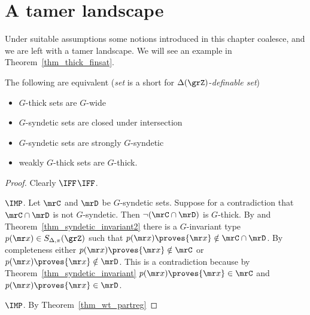 \section{A tamer landscape}\label{tame_landscape}

Under suitable assumptions some notions introduced in this chapter coalesce, and we are left with a tamer landscape.
We will see an example in Theorem~\ref{thm_thick_finsat}.

\begin{theorem}\label{thm_coalesce}
  The following are equivalent (\textit{set\/} is a short for $\Delta(\grZ)$-\textit{definable set})\nobreak
  \begin{itemize}
    \item[1.] $G$-thick sets are $G$-wide
    \item[2.] $G$-syndetic sets are closed under intersection 
    \item[3.] $G$-syndetic sets are strongly $G$-syndetic
    \item[4.] weakly $G$-thick sets are $G$-thick.
  \end{itemize}
\end{theorem}

\begin{proof}
  Clearly $\IFF$$\IFF$.

  $\IMP$.
  Let $\mrC$ and $\mrD$ be $G$-syndetic sets.
  Suppose for a contradiction that $\mrC\cap\mrD$ is not $G$-syndetic.
  Then $\neg(\mrC\cap\mrD)$ is $G$-thick.
  By  and Theorem~\ref{thm_syndetic_invariant2} there is a $G$-invariant type $p({\mr x})\in S_{\Delta,\pi}(\grZ)$ such that $p({\mr x})\proves{\mr x}\notin\mrC\cap\mrD$.
  By completeness either $p({\mr x})\proves{\mr x}\notin\mrC$ or $p({\mr x})\proves{\mr x}\notin\mrD$.
  This is a contradiction because by Theorem~\ref{thm_syndetic_invariant} $p({\mr x})\proves{\mr x}\in\mrC$ and $p({\mr x})\proves{\mr x}\in\mrD$.


  $\IMP$. By Theorem~\ref{thm_wt_partreg}
\end{proof}

